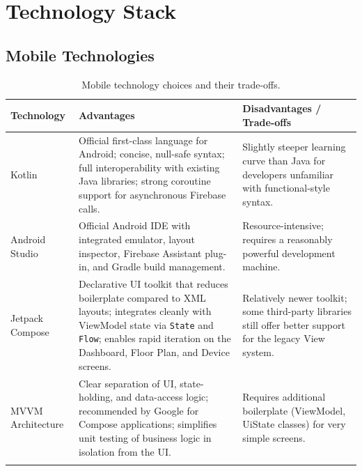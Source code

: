 \documentclass[11pt,a4paper]{article}
\begin{document}
\section{Technology Stack}
\label{sec:techstack}

\subsection{Mobile Technologies}
\begin{longtable}{@{}p{2.6cm}p{5.4cm}p{5cm}@{}}
\toprule
\textbf{Technology} & \textbf{Advantages} & \textbf{Disadvantages / Trade-offs} \\
\midrule
\endhead
Kotlin & Official first-class language for Android; concise, null-safe syntax; full interoperability with existing Java libraries; strong coroutine support for asynchronous Firebase calls. & Slightly steeper learning curve than Java for developers unfamiliar with functional-style syntax. \\
Android Studio & Official Android IDE with integrated emulator, layout inspector, Firebase Assistant plug-in, and Gradle build management. & Resource-intensive; requires a reasonably powerful development machine. \\
Jetpack Compose & Declarative UI toolkit that reduces boilerplate compared to XML layouts; integrates cleanly with ViewModel state via \texttt{State} and \texttt{Flow}; enables rapid iteration on the Dashboard, Floor Plan, and Device screens. & Relatively newer toolkit; some third-party libraries still offer better support for the legacy View system. \\
MVVM Architecture & Clear separation of UI, state-holding, and data-access logic; recommended by Google for Compose applications; simplifies unit testing of business logic in isolation from the UI. & Requires additional boilerplate (ViewModel, UiState classes) for very simple screens. \\
\bottomrule
\caption{Mobile technology choices and their trade-offs.}
\label{tab:mobile-tech}
\end{longtable}
\end{document}
